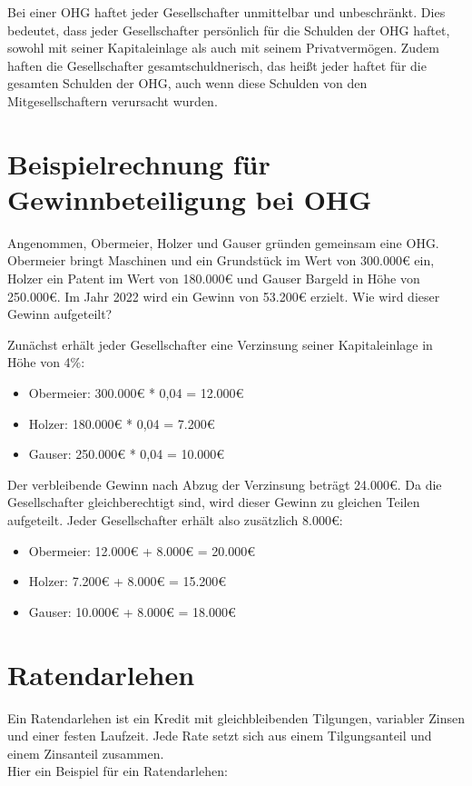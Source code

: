 \documentclass{article}
\begin{document}
Bei einer OHG haftet jeder Gesellschafter unmittelbar und unbeschränkt. Dies
bedeutet, dass jeder Gesellschafter persönlich für die Schulden der OHG haftet,
sowohl mit seiner Kapitaleinlage als auch mit seinem Privatvermögen. Zudem
haften die Gesellschafter gesamtschuldnerisch, das heißt jeder haftet für die
gesamten Schulden der OHG, auch wenn diese Schulden von den Mitgesellschaftern
verursacht wurden.

\section*{Beispielrechnung für Gewinnbeteiligung bei OHG}

Angenommen, Obermeier, Holzer und Gauser gründen gemeinsam eine OHG. Obermeier
bringt Maschinen und ein Grundstück im Wert von 300.000€ ein, Holzer ein Patent
im Wert von 180.000€ und Gauser Bargeld in Höhe von 250.000€. Im Jahr 2022 wird
ein Gewinn von 53.200€ erzielt. Wie wird dieser Gewinn aufgeteilt?

Zunächst erhält jeder Gesellschafter eine Verzinsung seiner Kapitaleinlage in Höhe von 4\%:

\begin{itemize}
  \item Obermeier: 300.000€ * 0,04 = 12.000€
  \item Holzer: 180.000€ * 0,04 = 7.200€
  \item Gauser: 250.000€ * 0,04 = 10.000€
\end{itemize}

Der verbleibende Gewinn nach Abzug der Verzinsung beträgt 24.000€. Da die
Gesellschafter gleichberechtigt sind, wird dieser Gewinn zu gleichen Teilen
aufgeteilt. Jeder Gesellschafter erhält also zusätzlich 8.000€:

\begin{itemize}
  \item Obermeier: 12.000€ + 8.000€ = 20.000€
  \item Holzer: 7.200€ + 8.000€ = 15.200€
  \item Gauser: 10.000€ + 8.000€ = 18.000€
\end{itemize}

\section*{Ratendarlehen}

Ein Ratendarlehen ist ein Kredit mit gleichbleibenden Tilgungen, variabler Zinsen und einer festen
Laufzeit. Jede Rate setzt sich aus einem Tilgungsanteil und einem Zinsanteil
zusammen.\\
Hier ein Beispiel für ein Ratendarlehen:
\end{document}
